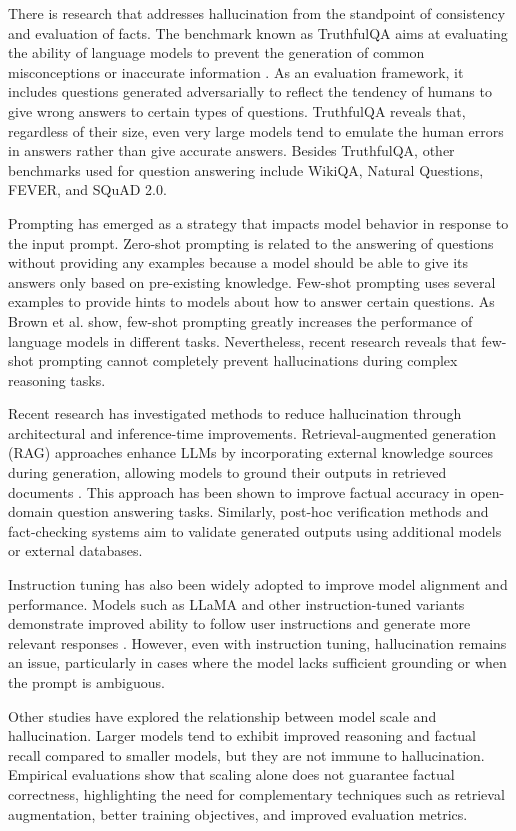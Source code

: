 \documentclass[sigconf,nonacm]{acmart}
\begin{document}
There is research that addresses hallucination from the standpoint of consistency and evaluation of facts. The benchmark known as TruthfulQA aims at evaluating the ability of language models to prevent the generation of common misconceptions or inaccurate information \cite{lin2021truthfulqa}. As an evaluation framework, it includes questions generated adversarially to reflect the tendency of humans to give wrong answers to certain types of questions. TruthfulQA reveals that, regardless of their size, even very large models tend to emulate the human errors in answers rather than give accurate answers. Besides TruthfulQA, other benchmarks used for question answering include WikiQA, Natural Questions, FEVER, and SQuAD 2.0.

Prompting has emerged as a strategy that impacts model behavior in response to the input prompt. Zero-shot prompting is related to the answering of questions without providing any examples because a model should be able to give its answers only based on pre-existing knowledge. Few-shot prompting uses several examples to provide hints to models about how to answer certain questions. As Brown et al. \cite{brown2020language} show, few-shot prompting greatly increases the performance of language models in different tasks. Nevertheless, recent research reveals that few-shot prompting cannot completely prevent hallucinations during complex reasoning tasks.

Recent research has investigated methods to reduce hallucination through architectural and inference-time improvements. Retrieval-augmented generation (RAG) approaches enhance LLMs by incorporating external knowledge sources during generation, allowing models to ground their outputs in retrieved documents \cite{lewis2020retrieval}. This approach has been shown to improve factual accuracy in open-domain question answering tasks. Similarly, post-hoc verification methods and fact-checking systems aim to validate generated outputs using additional models or external databases.

Instruction tuning has also been widely adopted to improve model alignment and performance. Models such as LLaMA and other instruction-tuned variants demonstrate improved ability to follow user instructions and generate more relevant responses \cite{touvron2023llama}. However, even with instruction tuning, hallucination remains an issue, particularly in cases where the model lacks sufficient grounding or when the prompt is ambiguous.

Other studies have explored the relationship between model scale and hallucination. Larger models tend to exhibit improved reasoning and factual recall compared to smaller models, but they are not immune to hallucination. Empirical evaluations show that scaling alone does not guarantee factual correctness, highlighting the need for complementary techniques such as retrieval augmentation, better training objectives, and improved evaluation metrics.
\end{document}
